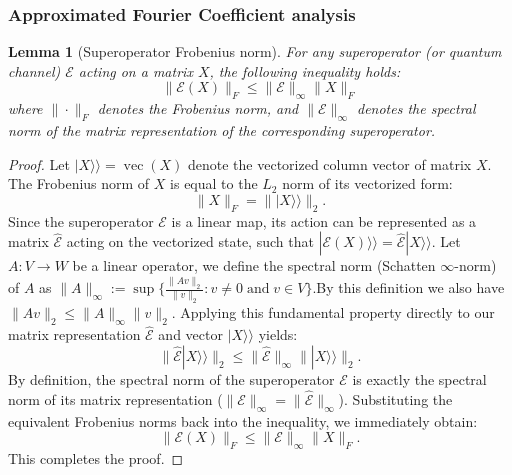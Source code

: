 \documentclass[%
 reprint,
 amsmath,amssymb,
 aps,
 pra,
]{revtex4-2}
\newtheorem{lemma}[theorem]{Lemma}
\theoremstyle{definition}
\begin{document}
\subsubsection{Approximated Fourier Coefficient analysis}

\begin{lemma}[Superoperator Frobenius norm]
\label{lemma:superoperator_norm}
For any superoperator (or quantum channel) $\mathcal{E}$ acting on a matrix $X$, the following inequality holds:
\begin{equation}
    \|\mathcal{E}(X)\|_F \leq \|\mathcal{E}\|_{\infty} \|X\|_F
\end{equation}
where $\|\cdot\|_F$ denotes the Frobenius norm, and $\|\mathcal{E}\|_{\infty}$ denotes the spectral norm of the matrix representation of the corresponding superoperator.
\end{lemma}

\begin{proof}
Let $|X\rangle\rangle = \operatorname{vec}(X)$ denote the vectorized column vector of matrix $X$. The Frobenius norm of $X$ is equal to the $L_2$ norm of its vectorized form:
\begin{equation}
    \|X\|_F = \||X\rangle\rangle\|_2.
\end{equation}
Since the superoperator $\mathcal{E}$ is a linear map, its action can be represented as a matrix $\hat{\mathcal{E}}$ acting on the vectorized state, such that $|\mathcal{E}(X)\rangle\rangle = \hat{\mathcal{E}}|X\rangle\rangle$. Let $A: V \rightarrow W$ be a linear operator, we define the spectral norm (Schatten $\infty$-norm) of $A$ as $\|A\|_{\infty}:=\sup\{\frac{\|A v\|_2}{\|v\|_2}: v \neq 0\; \text{and}\; v \in V\}$.By this definition we also have $\|Av\|_2 \leq \|A\|_{\infty}\|v\|_2$. Applying this fundamental property directly to our matrix representation $\hat{\mathcal{E}}$ and vector $|X\rangle\rangle$ yields:
\begin{equation}
    \| \hat{\mathcal{E}} |X\rangle\rangle \|_2 \leq \|\hat{\mathcal{E}}\|_{\infty} \| |X\rangle\rangle \|_2.
\end{equation}
By definition, the spectral norm of the superoperator $\mathcal{E}$ is exactly the spectral norm of its matrix representation ($\|\mathcal{E}\|_{\infty} = \|\hat{\mathcal{E}}\|_{\infty}$). Substituting the equivalent Frobenius norms back into the inequality, we immediately obtain:
\begin{equation}
    \|\mathcal{E}(X)\|_F \leq \|\mathcal{E}\|_{\infty} \|X\|_F.
\end{equation}
This completes the proof.
\end{proof}
\end{document}
